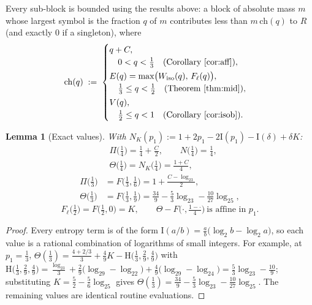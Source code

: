 \documentclass[journal]{IEEEtran}
\newtheorem{lemma}{Lemma}
\theoremstyle{definition}
\newcommand{\lgg}{\log_2}
\newcommand{\CC}{C}
\begin{document}
Every sub-block is bounded using the results above: a block of absolute mass $m$
whose largest symbol is the fraction $q$ of $m$ contributes less than
$m\,\mathrm{ch}(q)$ to $R$ (and exactly $0$ if a singleton), where
\begin{equation}\label{eq:charge-q}
  \mathrm{ch}(q)\;:=\;
  \begin{cases}
    q+\CC,\\
    \quad 0<q<\tfrac13
      \quad\text{(Corollary~\ref{cor:aff})},\\[2pt]
    E(q)=\max\bigl(W_{\mathrm{iso}}(q),\,F_\ell(q)\bigr),\\
    \quad \tfrac13\le q<\tfrac12
      \quad\text{(Theorem~\ref{thm:mid})},\\[2pt]
    V(q),\\
    \quad \tfrac12\le q<1
      \quad\text{(Corollary~\ref{cor:isob})}.
  \end{cases}
\end{equation}

\begin{lemma}[Exact values]\label{lem:exact-q}
With $N_K(p_1):=1+2p_1-2\mathrm I(p_1)-\mathrm I(\delta)+\delta K$:
\[
\begin{aligned}
  &\Pi\bigl(\tfrac14\bigr)=\tfrac14+\tfrac{\CC}2,\qquad
  N\bigl(\tfrac14\bigr)=\tfrac14,\\
  &\Theta\bigl(\tfrac14\bigr)=N_K\bigl(\tfrac14\bigr)=\tfrac{1+\CC}4,
\end{aligned}
\]
\[
\begin{aligned}
  \Pi\bigl(\tfrac13\bigr)&=F\bigl(\tfrac13,\tfrac16\bigr)=1+\tfrac{\CC-\lgg3}2,\\
  \Theta\bigl(\tfrac13\bigr)&=F\bigl(\tfrac13,\tfrac19\bigr)
  =\tfrac{34}9-\tfrac53\lgg3-\tfrac{10}{27}\lgg5,
\end{aligned}
\]
\[
  F_\ell\bigl(\tfrac12\bigr)=F\bigl(\tfrac12,0\bigr)=K,\qquad
  \Theta-F\bigl(\cdot,\tfrac{1-\cdot}4\bigr)\ \text{is affine in }p_1 .
\]
\end{lemma}

\begin{proof}
Every entropy term is of the form
$\mathrm I(a/b)=\tfrac ab\bigl(\lgg b-\lgg a\bigr)$, so each value is a
rational combination of logarithms of small integers. For example, at
$p_1=\tfrac13$,
$\Theta(\tfrac13)=\tfrac{4+2/3}{3}+\tfrac{4}{9}K-\mathrm H\bigl(\tfrac13,\tfrac29,\tfrac49\bigr)$
with
$\mathrm H\bigl(\tfrac13,\tfrac29,\tfrac49\bigr)
=\tfrac{\lgg3}3+\tfrac29\bigl(\lgg9-\lgg2\bigr)+\tfrac49\bigl(\lgg9-\lgg4\bigr)
=\tfrac53\lgg3-\tfrac{10}9$; substituting $K=\tfrac52-\tfrac56\lgg5$ gives
$\Theta(\tfrac13)=\tfrac{34}9-\tfrac53\lgg3-\tfrac{10}{27}\lgg5$. The
remaining values are identical routine evaluations.
\end{proof}
\end{document}
